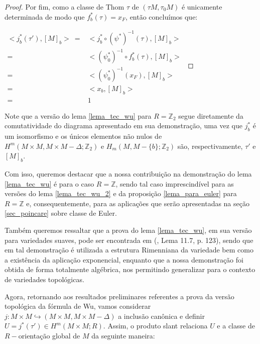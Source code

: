 \documentclass[12pt,oneside]{book} %
\newcommand{\Z}{\mathbb{Z}}
\begin{document}
\begin{proof}
	\par Por fim, como a classe de Thom $\tau$ de $(\tau M,\tau_{0}M)$ é unicamente determinada de modo que $f_{b}^{*}(\tau)=x_{F}$, então concluímos que: \newline
	
	$ \begin{array}{rl}
		<j_{b}^{*}(\tau'),[M]_{b}> \ = & <j_{b}^{*}\circ (\psi^{*})^{-1}(\tau),[M]_{b}> \\
		= & <(\psi_{0}^{*})^{-1}\circ f_{b}^{*}(\tau),[M]_{b}> \\
		= & <(\psi_{0}^{*})^{-1}(x_{F}),[M]_{b}> \\
		= & <x_{b},[M]_{b}> \\
		= & 1
	\end{array} $
	
\end{proof}

\par Note que a versão do lema \ref{lema_tec_wu} para $R=\Z_{2}$ segue diretamente da comutatividade do diagrama apresentado em sua demonstração, uma vez que $j_{b}^{*}$ é um isomorfismo e os únicos elementos não nulos de $H^{m}(M\times M,M\times M-\Delta;\Z_{2})$ e $H_{m}(M,M-\{b\};\Z_{2})$ são, respectivamente, $\tau'$ e $[M]_{b}$.

\par Com isso, queremos destacar que a nossa contribuição na demonstração do lema \ref{lema_tec_wu} é para o caso $R=\Z$, sendo tal caso imprescindível para as versões do lema \ref{lema_tec_wu_2} e da proposição \ref{lema_para_euler} para $R=\Z$ e, consequentemente, para as aplicações que serão apresentadas na seção \ref{sec_poincare} sobre classe de Euler.

\par Também queremos ressaltar que a prova do lema \ref{lema_tec_wu}, em sua versão para variedades suaves, pode ser encontrada em (\cite{milnor_1}, Lema 11.7, p. 123), sendo que em tal demonstração é utilizada a estrutura Rimenniana da variedade bem como a existência da aplicação exponencial, enquanto que a nossa demonstração foi obtida de forma totalmente algébrica, nos permitindo generalizar para o contexto de variedades topológicas.

\par Agora, retornando aos resultados preliminares referentes a prova da versão topológica da fórmula de Wu, vamos considerar $j:M\times M\hookrightarrow (M\times M,M\times M-\Delta)$ a inclusão canônica e definir $U=j^{*}(\tau')\in H^{m}(M\times M;R)$. Assim, o produto slant relaciona $U$ e a classe de $R-$orientação global de $M$ da seguinte maneira:
\end{document}
